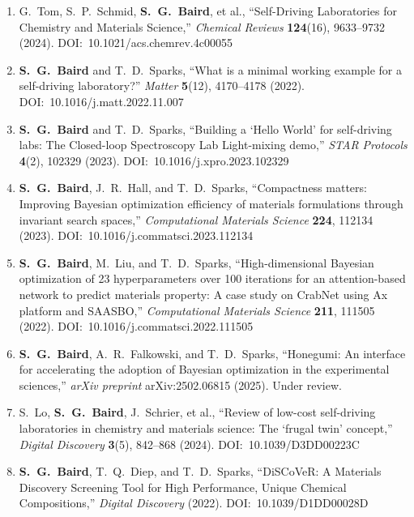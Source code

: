 \documentclass[11pt,letterpaper]{article}
\begin{document}
\begin{enumerate}[leftmargin=*]
\item G.\ Tom, S.\ P.\ Schmid, \textbf{S.\ G.\ Baird}, et al.,
  ``Self-Driving Laboratories for Chemistry and Materials Science,''
  \textit{Chemical Reviews} \textbf{124}(16), 9633--9732 (2024).
  DOI:~10.1021/acs.chemrev.4c00055

\item \textbf{S.\ G.\ Baird} and T.\ D.\ Sparks,
  ``What is a minimal working example for a self-driving laboratory?''
  \textit{Matter} \textbf{5}(12), 4170--4178 (2022).
  DOI:~10.1016/j.matt.2022.11.007

\item \textbf{S.\ G.\ Baird} and T.\ D.\ Sparks,
  ``Building a `Hello World' for self-driving labs: The Closed-loop
  Spectroscopy Lab Light-mixing demo,''
  \textit{STAR Protocols} \textbf{4}(2), 102329 (2023).
  DOI:~10.1016/j.xpro.2023.102329

\item \textbf{S.\ G.\ Baird}, J.\ R.\ Hall, and T.\ D.\ Sparks,
  ``Compactness matters: Improving Bayesian optimization efficiency of
  materials formulations through invariant search spaces,''
  \textit{Computational Materials Science} \textbf{224}, 112134 (2023).
  DOI:~10.1016/j.commatsci.2023.112134

\item \textbf{S.\ G.\ Baird}, M.\ Liu, and T.\ D.\ Sparks,
  ``High-dimensional Bayesian optimization of 23 hyperparameters over 100
  iterations for an attention-based network to predict materials property:
  A case study on CrabNet using Ax platform and SAASBO,''
  \textit{Computational Materials Science} \textbf{211}, 111505 (2022).
  DOI:~10.1016/j.commatsci.2022.111505

\item \textbf{S.\ G.\ Baird}, A.\ R.\ Falkowski, and T.\ D.\ Sparks,
  ``Honegumi: An interface for accelerating the adoption of Bayesian
  optimization in the experimental sciences,''
  \textit{arXiv preprint} arXiv:2502.06815 (2025). Under review.

\item S.\ Lo, \textbf{S.\ G.\ Baird}, J.\ Schrier, et al.,
  ``Review of low-cost self-driving laboratories in chemistry and materials
  science: The `frugal twin' concept,''
  \textit{Digital Discovery} \textbf{3}(5), 842--868 (2024).
  DOI:~10.1039/D3DD00223C

\item \textbf{S.\ G.\ Baird}, T.\ Q.\ Diep, and T.\ D.\ Sparks,
  ``DiSCoVeR: A Materials Discovery Screening Tool for High Performance,
  Unique Chemical Compositions,''
  \textit{Digital Discovery} (2022).
  DOI:~10.1039/D1DD00028D


\end{enumerate}
\end{document}
